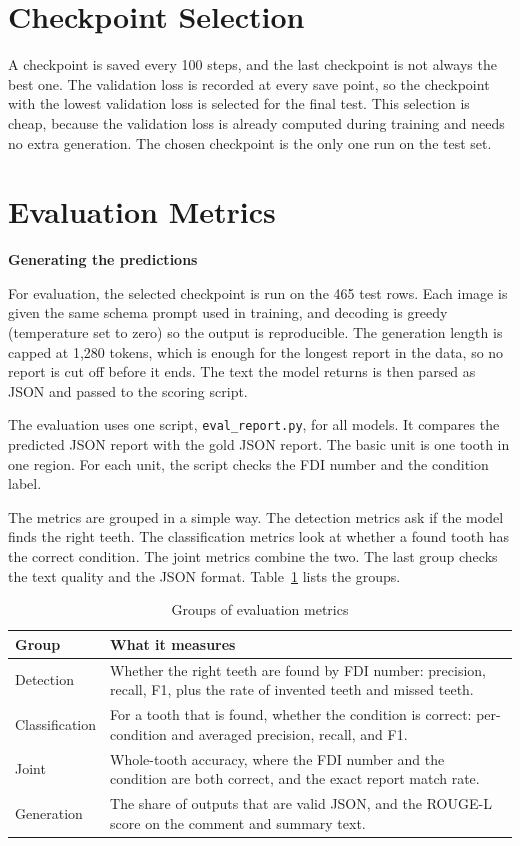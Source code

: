 \documentclass[a4paper,12pt]{report}
\newcommand{\minisection}[1]{%
  \vspace{1ex}
  \noindent\textbf{#1}\par
  \vspace{0.5ex}
}
\begin{document}
\section{Checkpoint Selection}

A checkpoint is saved every 100 steps, and the last checkpoint is not always the best one. The validation loss is recorded at every save point, so the checkpoint with the lowest validation loss is selected for the final test. This selection is cheap, because the validation loss is already computed during training and needs no extra generation. The chosen checkpoint is the only one run on the test set.

\section{Evaluation Metrics}

\minisection{Generating the predictions}

For evaluation, the selected checkpoint is run on the 465 test rows. Each image is given the same schema prompt used in training, and decoding is greedy (temperature set to zero) so the output is reproducible. The generation length is capped at 1{,}280 tokens, which is enough for the longest report in the data, so no report is cut off before it ends. The text the model returns is then parsed as JSON and passed to the scoring script.

The evaluation uses one script, \texttt{eval\_report.py}, for all models. It compares the predicted JSON report with the gold JSON report. The basic unit is one tooth in one region. For each unit, the script checks the FDI number and the condition label.

The metrics are grouped in a simple way. The detection metrics ask if the model finds the right teeth. The classification metrics look at whether a found tooth has the correct condition. The joint metrics combine the two. The last group checks the text quality and the JSON format. Table~\ref{tab:eval-metrics} lists the groups.

\begin{table}[H]
\centering
\caption{Groups of evaluation metrics}
\label{tab:eval-metrics}
\begin{tabular}{lp{8.5cm}}
\toprule
Group & What it measures \\
\midrule
Detection      & Whether the right teeth are found by FDI number: precision, recall, F1, plus the rate of invented teeth and missed teeth. \\
Classification & For a tooth that is found, whether the condition is correct: per-condition and averaged precision, recall, and F1. \\
Joint          & Whole-tooth accuracy, where the FDI number and the condition are both correct, and the exact report match rate. \\
Generation     & The share of outputs that are valid JSON, and the ROUGE-L score on the comment and summary text. \\
\bottomrule
\end{tabular}
\end{table}
\end{document}
